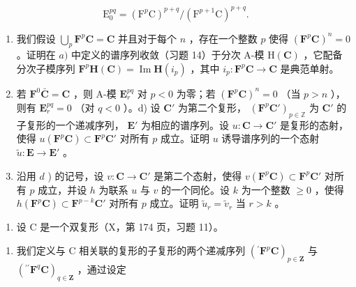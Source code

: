 \[
\mathrm{E} _ {0} ^ {p q} = (\mathrm{F} ^ {p} \mathrm{C}) ^ {p + q} / (\mathrm{F} ^ {p + 1} \mathrm{C}) ^ {p + q}.
\]

\begin{enumerate}
\def\labelenumi{\alph{enumi})}
\setcounter{enumi}{1}
\item
  我们假设 \(\bigcup_{p} \mathbf{F}^{p} \mathbf{C} = \mathbf{C}\) 并且对于每个 \(n\) ，存在一个整数 \(p\) 使得 \((\mathbf{F}^{p} \mathbf{C})^{n} = 0\) 。证明在 \(a)\) 中定义的谱序列收敛（习题 14）于分次 A-模 \(\mathrm{H}(\mathbf{C})\) ，它配备分次子模序列 \(\mathbf{F}^{p} \mathbf{H}(\mathbf{C}) = \operatorname{Im} \mathbf{H}(i_{p})\) ，其中 \(i_{p}: \mathbf{F}^{p} \mathbf{C} \to \mathbf{C}\) 是典范单射。
\item
  若 \(\mathbf{F}^0\bar{\mathbf{C}} = \mathbf{C}\) ，则 A-模 \(\mathbf{E}_r^{pq}\) 对 \(p < 0\) 为零；若 \((\mathbf{F}^p\mathbf{C})^n = 0\) （当 \(p > n\) ），则有 \(\mathbf{E}_r^{pq} = 0\) （对 \(q < 0\) ）。d) 设 \(\mathbf{C}'\) 为第二个复形， \((\mathbf{F}^p\mathbf{C}')_{p\in \mathbb{Z}}\) 为 \(\mathbf{C}'\) 的子复形的一个递减序列， \(\mathbf{E}'\) 为相应的谱序列。设 \(u:\mathbf{C}\to \mathbf{C}'\) 是复形的态射，使得 \(u(\mathbf{F}^p\mathbf{C})\subset \mathbf{F}^p\mathbf{C}'\) 对所有 \(p\) 成立。证明 \(u\) 诱导谱序列的一个态射 \(\tilde{u}:\mathbf{E}\to \mathbf{E}'\) 。
\item
  沿用 \(d\) ) 的记号，设 \(v: \mathbf{C} \to \mathbf{C}'\) 是第二个态射，使得 \(v(\mathbf{F}^p \mathbf{C}) \subset \mathbf{F}^p \mathbf{C}'\) 对所有 \(p\) 成立，并设 \(h\) 为联系 \(u\) 与 \(v\) 的一个同伦。设 \(k\) 为一个整数 \(\geqslant 0\) ，使得 \(h(\mathbf{F}^p \mathbf{C}) \subset \mathbf{F}^{p-k} \mathbf{C}'\) 对所有 \(p\) 成立。证明 \(\tilde{u}_r = \tilde{v}_r\) 当 \(r > k\) 。
\end{enumerate}

\begin{enumerate}
\def\labelenumi{\arabic{enumi})}
\setcounter{enumi}{16}
\tightlist
\item
  设 C 是一个双复形（X，第 174 页，习题 11）。
\end{enumerate}

\begin{enumerate}
\def\labelenumi{\alph{enumi})}
\tightlist
\item
  我们定义与 C 相关联的复形的子复形的两个递减序列 \(({}^{\prime}\mathbf{F}^p\mathbf{C})_{p\in \mathbf{Z}}\) 与 \(({}^{\prime\prime}\mathbf{F}^q\mathbf{C})_{q\in \mathbf{Z}}\) ，通过设定
\end{enumerate}

